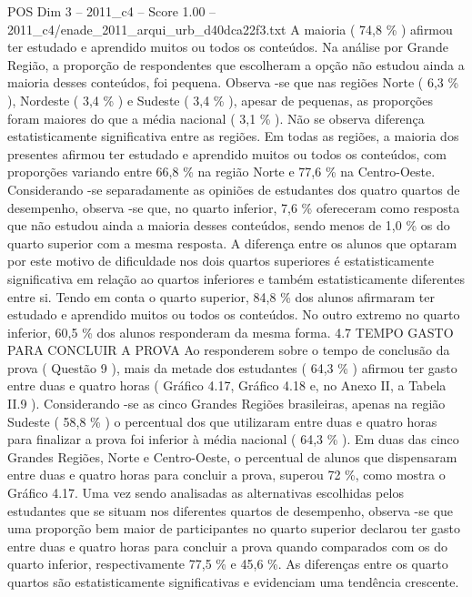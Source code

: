 \begin{textsample}{POS Dim 3 – 2011\_c4 – Score 1.00 – 2011\_c4/enade\_2011\_arqui\_urb\_d40dca22f3.txt}
A maioria ( 74,8 \% ) afirmou ter estudado e aprendido muitos ou todos os conteúdos.
Na análise por Grande Região, a proporção de respondentes que escolheram a opção não estudou ainda a maioria desses conteúdos, foi pequena.
Observa -se que nas regiões Norte ( 6,3 \% ), Nordeste ( 3,4 \% ) e Sudeste ( 3,4 \% ), apesar de pequenas, as proporções foram maiores do que a média nacional ( 3,1 \% ).
Não se observa diferença estatisticamente significativa entre as regiões.
Em todas as regiões, a maioria dos presentes afirmou ter estudado e aprendido muitos ou todos os conteúdos, com proporções variando entre 66,8 \% na região Norte e 77,6 \% na Centro-Oeste.
Considerando -se separadamente as opiniões de estudantes dos quatro quartos de desempenho, observa -se que, no quarto inferior, 7,6 \% ofereceram como resposta que não estudou ainda a maioria desses conteúdos, sendo menos de 1,0 \% os do quarto superior com a mesma resposta.
A diferença entre os alunos que optaram por este motivo de dificuldade nos dois quartos superiores é estatisticamente significativa em relação ao quartos inferiores e também estatisticamente diferentes entre si.
Tendo em conta o quarto superior, 84,8 \% dos alunos afirmaram ter estudado e aprendido muitos ou todos os conteúdos.
No outro extremo no quarto inferior, 60,5 \% dos alunos responderam da mesma forma. 4.7 TEMPO GASTO PARA CONCLUIR A PROVA Ao responderem sobre o tempo de conclusão da prova ( Questão 9 ), mais da metade dos estudantes ( 64,3 \% ) afirmou ter gasto entre duas e quatro horas ( Gráfico 4.17, Gráfico 4.18 e, no Anexo II, a Tabela II.9 ).
Considerando -se as cinco Grandes Regiões brasileiras, apenas na região Sudeste ( 58,8 \% ) o percentual dos que utilizaram entre duas e quatro horas para finalizar a prova foi inferior à média nacional ( 64,3 \% ).
Em duas das cinco Grandes Regiões, Norte e Centro-Oeste, o percentual de alunos que dispensaram entre duas e quatro horas para concluir a prova, superou 72 \%, como mostra o Gráfico 4.17.
Uma vez sendo analisadas as alternativas escolhidas pelos estudantes que se situam nos diferentes quartos de desempenho, observa -se que uma proporção bem maior de participantes no quarto superior declarou ter gasto entre duas e quatro horas para concluir a prova quando comparados com os do quarto inferior, respectivamente 77,5 \% e 45,6 \%.
As diferenças entre os quarto quartos são estatisticamente significativas e evidenciam uma tendência crescente.

\end{textsample}
